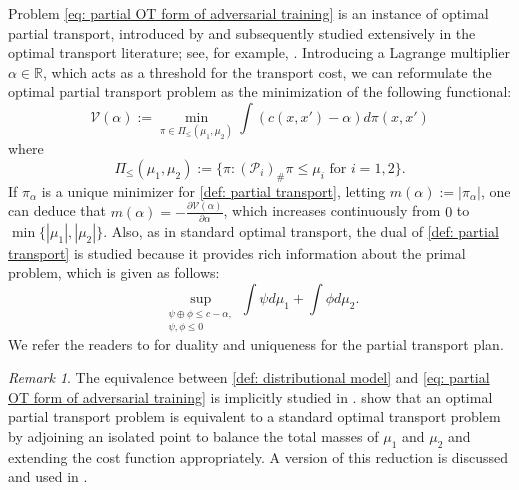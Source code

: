 \documentclass{amsart}
\theoremstyle{plain}
\numberwithin{equation}{section}\newtheorem{theorem}{Theorem}[section]
\theoremstyle{remark}
\newtheorem{remark}[theorem]{Remark}
\begin{document}
Problem \eqref{eq: partial OT form of adversarial training} is an instance of optimal partial transport, introduced by \citet{CM2010Annalsmath} and subsequently studied extensively in the optimal transport literature; see, for example, \cite{Figalli2010ARMA, FreePOT_Indrei2013, MultiPOT2015, DynamicPOT2016, POT_lagrangian2018}. Introducing a Lagrange multiplier $\alpha \in \mathbb{R}$, which acts as a threshold for the transport cost, we can reformulate the optimal partial transport problem as the minimization of the following functional:
\begin{equation} \label{def: partial transport}
    \mathcal{V}(\alpha) :=\min_{\pi\in\Pi_\leq(\mu_1, \mu_2)}  \int (c(x,x') - \alpha) d\pi(x,x')
\end{equation}       
where
\[
    \Pi_\leq(\mu_1, \mu_2):= \{ \pi : (\mathcal{P}_i)_\# \pi \leq \mu_i \text{ for } i=1,2 \}.
\]
If $\pi_\alpha$ is a unique minimizer for \eqref{def: partial transport}, letting $m(\alpha):= |\pi_\alpha|$, one can deduce that $m(\alpha) = - \frac{\partial \mathcal{V}(\alpha)}{\partial \alpha}$, which increases continuously from $0$ to $\min \{|\mu_1|, |\mu_2| \}$. Also, as in standard optimal transport, the dual of \eqref{def: partial transport} is studied because it provides rich information about the primal problem, which is given as follows:
\begin{equation}\label{def: dual of partial transport}
    \sup_{\substack{ \psi \oplus \phi \leq c - \alpha,   \\ \psi, \phi \leq 0}} \int\psi d\mu_1 + \int \phi d\mu_2.    
\end{equation}
We refer the readers to \cite{CM2010Annalsmath} for duality and uniqueness for the partial transport plan.



\begin{remark}
The equivalence between \eqref{def: distributional model} and \eqref{eq: partial OT form of adversarial training} is implicitly studied in \cite{jakwang_MOT}. \citet{CM2010Annalsmath} show that an optimal partial transport problem is equivalent to a standard optimal transport problem by adjoining an isolated point to balance the total masses of $\mu_1$ and $\mu_2$ and extending the cost function appropriately. A version of this reduction is discussed and used in \cite[Theorem 6]{jakwang_MOT}.
\end{remark}
\end{document}
